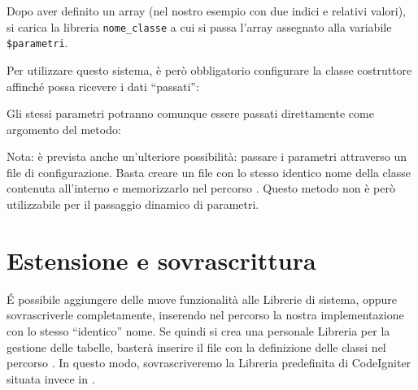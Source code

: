 
Dopo aver definito un array (nel nostro esempio con due indici e relativi valori), si carica la libreria \verb|nome_classe| a cui si passa l'array assegnato alla variabile \verb|$parametri|.

Per utilizzare questo sistema, è però obbligatorio configurare la classe costruttore affinché possa ricevere i dati ``passati'':


Gli stessi parametri potranno comunque essere passati direttamente come argomento del metodo:


Nota: è prevista anche un'ulteriore possibilità: passare i parametri attraverso un file di configurazione. Basta creare un file con lo stesso identico nome della classe contenuta all'interno e memorizzarlo nel percorso . Questo metodo non è però utilizzabile per il passaggio dinamico di parametri.

\section*{Estensione e sovrascrittura}
\'E possibile aggiungere delle nuove funzionalità alle Librerie di sistema, oppure sovrascriverle completamente, inserendo nel percorso  la nostra implementazione con lo stesso ``identico'' nome. Se quindi si crea una personale Libreria per la gestione delle tabelle, basterà inserire il file  con la definizione delle classi nel percorso . In questo modo, sovrascriveremo la Libreria predefinita di CodeIgniter situata invece in .

